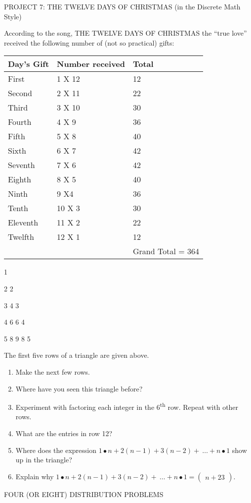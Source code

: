 \documentclass[10pt,letter]{article}
\begin{document}
PROJECT 7: THE TWELVE DAYS OF CHRISTMAS (in the Discrete Math Style)

According to the song, THE TWELVE DAYS OF CHRISTMAS the ``true love''
received the following number of (not so practical) gifts:

\begin{longtable}[]{@{}lll@{}}
\toprule
Day's Gift & Number received & Total\tabularnewline
\midrule
\endhead
First & 1 X 12 & 12\tabularnewline
Second & 2 X 11 & 22\tabularnewline
Third & 3 X 10 & 30\tabularnewline
Fourth & 4 X 9 & 36\tabularnewline
Fifth & 5 X 8 & 40\tabularnewline
Sixth & 6 X 7 & 42\tabularnewline
Seventh & 7 X 6 & 42\tabularnewline
Eighth & 8 X 5 & 40\tabularnewline
Ninth & 9 X4 & 36\tabularnewline
Tenth & 10 X 3 & 30\tabularnewline
Eleventh & 11 X 2 & 22\tabularnewline
Twelfth & 12 X 1 & 12\tabularnewline
& & Grand Total = 364\tabularnewline
\bottomrule

\end{longtable}

1

2 2

3 4 3

4 6 6 4

5 8 9 8 5

The first five rows of a triangle are given above.

\begin{enumerate}
\def\labelenumi{\arabic{enumi}.}

\item
  Make the next few rows.
\item
  Where have you seen this triangle before?
\item
  Experiment with factoring each integer in the 6\textsuperscript{th}
  row. Repeat with other rows.
\item
  What are the entries in row 12?
\item
  Where does the expression
  \(1 \bullet n + 2\left( n - 1 \right) + 3\left( n - 2 \right) + \ \ldots + n \bullet 1\)
  show up in the triangle?
\item
  Explain why
  \(1 \bullet n + 2\left( n - 1 \right) + 3\left( n - 2 \right) + \ \ldots + n \bullet 1 =

\begin{pmatrix}
  n + 2 
  3 
  \end{pmatrix}
\).

\end{enumerate}

FOUR (OR EIGHT) DISTRIBUTION PROBLEMS
\end{document}
